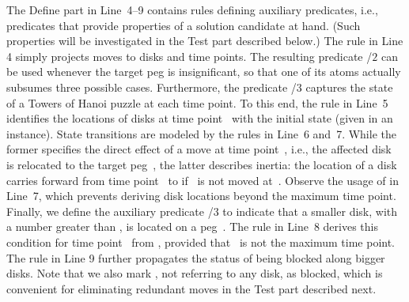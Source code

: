 The Define part in Line~4--9 contains
rules defining auxiliary predicates, i.e.,
predicates that provide properties of a solution candidate at hand.
(Such properties will be investigated in the Test part described below.)
The rule in Line 4 simply projects moves to disks and time points.
The resulting predicate /$2$ can be used whenever the target peg
is insignificant, so that one of its atoms actually subsumes three possible cases.
Furthermore,
the predicate /$3$ captures the state of a Towers of Hanoi puzzle at each time point.
To this end,
the rule in Line~5 
identifies 
the locations of disks at time point~
with the initial state (given in an instance).
State transitions are modeled by the rules in Line~6 and~7.
While the former specifies the direct effect of a move at time point~, i.e.,
the affected disk~ is relocated to the target peg~,
the latter describes inertia:
the location of a disk~
carries forward from time point~ to 
if~ is not moved at~.
Observe the usage of  in Line~7,
which prevents deriving disk locations beyond the maximum time point. %
Finally, we define the auxiliary predicate /$3$ to
indicate that a smaller disk, with a number greater than , is
located on a peg~.
The rule in Line~8 derives this condition for time point~
from , %
provided that~ is not the maximum time point.
The rule in Line 9 further propagates the status of being blocked
along bigger disks.
Note that we also mark , not referring to any disk, as blocked,
which is convenient for eliminating redundant moves
in the Test part described next.

